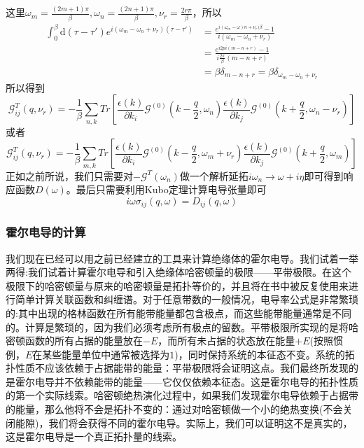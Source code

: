 \documentclass{article}
\numberwithin{equation}{subsection}
\begin{document}
这里$\omega_m=\frac{(2m+1)\pi}{\beta},\omega_n=\frac{(2n+1)\pi}{\beta},\nu_r=\frac{2r\pi}{\beta}$，所以
\begin{equation}
    \begin{split}
        \int_0^\beta\mathrm{d}(\tau-\tau')e^{i(\omega_m-\omega_n+\nu_r)(\tau-\tau')}&=\frac{e^{i(\omega_m-\omega)n+\nu_r)\beta}-1}{i(\omega_m-\omega_n+\nu_r)}\\
        &=\frac{e^{i2pi(m-n+r)}-1}{i\frac{2\pi}{\beta}(m-n+r)}\\
        &=\beta\delta_{m-n+r}=\beta\delta_{\omega_m-\omega_n+\nu_r}
    \end{split}
\end{equation}
所以得到
\begin{equation}
    \mathcal{G}_{ij}^T(q,\nu_r)=-\frac{1}{\beta}\sum_{n,k}Tr\left[\frac{\epsilon(k)}{\partial k_i}\mathcal{G}^{(0)}(k-\frac{q}{2},\omega_n)\frac{\epsilon(k)}{\partial k_j}\mathcal{G}^{(0)}(k+\frac{q}{2},\omega_n-\nu_r)\right]
\end{equation}
或者
\begin{equation}
    \mathcal{G}_{ij}^T(q,\nu_r)=-\frac{1}{\beta}\sum_{m,k}Tr\left[\frac{\epsilon(k)}{\partial k_i}\mathcal{G}^{(0)}(k-\frac{q}{2},\omega_m+\nu_r)\frac{\epsilon(k)}{\partial k_j}\mathcal{G}^{(0)}(k+\frac{q}{2},\omega_m)\right]
\end{equation}
正如之前所说，我们只需要对$-\mathcal{G}^{T}(\omega_n)$做一个解析延拓$i\omega_n\rightarrow\omega+i\eta$即可得到响应函数$D(\omega)$。最后只需要利用Kubo定理计算电导张量即可
\begin{equation}
    i\omega\sigma_{ij}(q,\omega)=D_{ij}(q,\omega)
\end{equation}
\subsubsection{霍尔电导的计算}
我们现在已经可以用之前已经建立的工具来计算绝缘体的霍尔电导。我们试着一举两得:我们试着计算霍尔电导和引入绝缘体哈密顿量的极限——平带极限。在这个极限下的哈密顿量与原来的哈密顿量是拓扑等价的，并且将在书中被反复使用来进行简单计算关联函数和纠缠谱。对于任意带数的一般情况，电导率公式是非常繁琐的:其中出现的格林函数在所有能带能量都包含极点，而这些能带能量通常是不同的。计算是繁琐的，因为我们必须考虑所有极点的留数。平带极限所实现的是将哈密顿函数的所有占据的能量放在$-E$，而所有未占据的状态放在能量$+E$(按照惯例，$E$在某些能量单位中通常被选择为$1$)，同时保持系统的本征态不变。系统的拓扑性质不应该依赖于占据能带的能量：平带极限将会证明这点。我们最终所发现的是霍尔电导并不依赖能带的能量——它仅仅依赖本征态。这是霍尔电导的拓扑性质的第一个实际线索。哈密顿绝热演化过程中，如果我们发现霍尔电导依赖于占据带的能量，那么他将不会是拓扑不变的：通过对哈密顿做一个小的绝热变换(不会关闭能隙)，我们将会获得不同的霍尔电导。实际上，我们可以证明这不是真实的，这是霍尔电导是一个真正拓扑量的线索。
\end{document}
